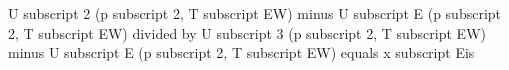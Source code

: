 U subscript 2 (p subscript 2, T subscript EW) minus U subscript E (p subscript 2, T subscript EW) divided by U subscript 3 (p subscript 2, T subscript EW) minus U subscript E (p subscript 2, T subscript EW) equals x subscript Eis